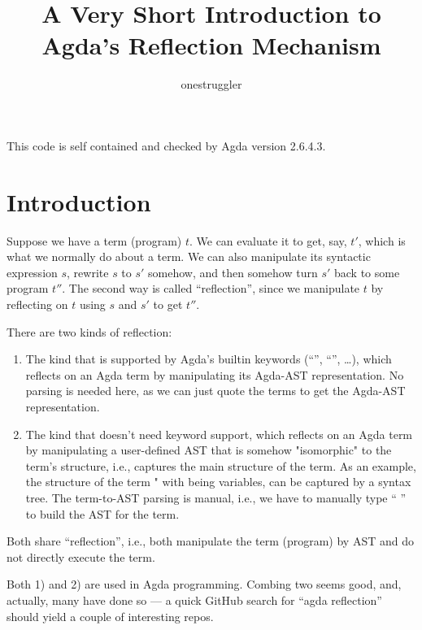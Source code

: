 \documentclass{article}
\title{A Very Short Introduction to Agda's Reflection Mechanism}
\author{onestruggler}
\begin{document}
\maketitle{}

This code is self contained and checked by Agda version 2.6.4.3.

\section{Introduction}
Suppose we have a term (program) \(t\). We can evaluate it to get, say, \(t'\), which is what we normally do about a term. We can also manipulate its syntactic expression \(s\), rewrite \(s\) to \(s'\) somehow, and then somehow turn \(s'\) back to some program \(t''\). The second way is called ``reflection'', since we manipulate \(t\) by reflecting on \(t\) using \(s\) and \(s'\) to get \(t''\).

There are two kinds of reflection:

\begin{enumerate}
  \item The kind that is supported by Agda's builtin keywords (``'', ``'', \ldots{}), which reflects on an Agda term by manipulating its Agda-AST representation. No parsing is needed here, as we can just quote the terms to get the Agda-AST representation.
  \item The kind that doesn't need keyword support, which reflects on an Agda term by manipulating a user-defined AST that is somehow "isomorphic" to the term's structure, i.e., captures the main structure of the term. As an example, the structure of the term  \AgdaOperator{\AgdaFunction{+}}  \AgdaOperator{\AgdaFunction{*}} " with    being variables, can be captured by a syntax tree. The term-to-AST parsing is manual, i.e., we have to manually type `` \AgdaOperator{\AgdaInductiveConstructor{:+}}  \AgdaOperator{\AgdaInductiveConstructor{:*}} '' to build the AST for the term.
\end{enumerate}

Both share ``reflection'', i.e., both manipulate the term (program) by AST and do not directly execute the term.

Both 1) and 2) are used in Agda programming. Combing two seems good, and, actually, many have done so --- a quick GitHub search for ``agda reflection'' should yield a couple of interesting repos.
\end{document}

